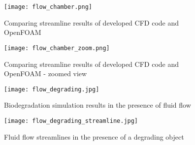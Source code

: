 \begin{figure}[h]
\centering
\medskip
\texttt{[image: flow\_chamber.png]}
\caption[Comparing flow field results of developed CFD code and OpenFOAM]{Comparing streamline results of developed CFD code and OpenFOAM} \label{fig:fluid_flow_chamber}
\end{figure}


\begin{figure}[h]
\centering
\medskip
\texttt{[image: flow\_chamber\_zoom.png]}
\caption[Comparing flow field results of developed CFD code and OpenFOAM - zoomed view]{Comparing streamline results of developed CFD code and OpenFOAM - zoomed view} \label{fig:fluid_flow_chamber_zoom}
\end{figure}

\begin{figure}[h]
\centering
\medskip
\texttt{[image: flow\_degrading.jpg]}
\caption[Biodegradation simulation results in the presence of fluid flow]{Biodegradation simulation results in the presence of fluid flow} \label{fig:fluid_flow_degrading}
\end{figure}


\begin{figure}[h]
\centering
\medskip
\texttt{[image: flow\_degrading\_streamline.jpg]}
\caption[Fluid flow streamlines in the presence of a degrading object]{Fluid flow streamlines in the presence of a degrading object} \label{fig:fluid_flow_degrading_streamline}
\end{figure}
















\cleardoublepage

